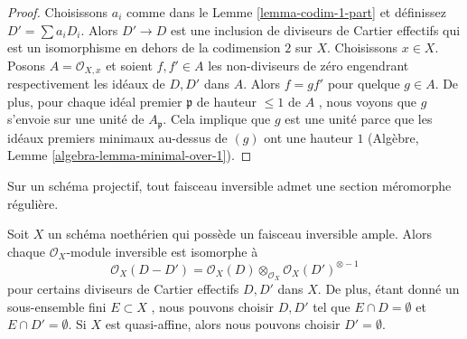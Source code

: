 \begin{proof}
Choisissons  $a_i$  comme dans le Lemme  \ref{lemma-codim-1-part}  et définissez
 $D' = \sum a_i D_i$. Alors  $D' \to D$  est une inclusion de diviseurs de Cartier
effectifs qui est un isomorphisme en dehors de la codimension  $2$  sur
 $X$. Choisissons  $x \in X$. Posons  $A = \mathcal{O}_{X, x}$  et soient
 $f, f' \in A$  les non-diviseurs de zéro engendrant respectivement les idéaux de  $D, D'$  dans
 $A$. Alors  $f = gf'$  pour quelque  $g \in A$. De plus, pour chaque
idéal premier  $\mathfrak p$  de hauteur  $\leq 1$  de  $A$ , nous voyons
que  $g$  s'envoie sur une unité de  $A_\mathfrak p$. Cela implique que
 $g$  est une unité parce que les idéaux premiers minimaux au-dessus de
 $(g)$  ont une hauteur  $1$  (Algèbre, Lemme  \ref{algebra-lemma-minimal-over-1}).
\end{proof}

\begin{lemma}
\label{lemma-quasi-projective-Noetherian-pic-effective-Cartier}
\begin{slogan}
Sur un schéma projectif, tout faisceau inversible admet une section méromorphe
régulière.
\end{slogan}
Soit  $X$  un schéma noethérien qui possède un faisceau inversible ample.
Alors chaque  $\mathcal{O}_X$-module inversible est isomorphe à
$$
\mathcal{O}_X(D - D') =
\mathcal{O}_X(D) \otimes_{\mathcal{O}_X} \mathcal{O}_X(D')^{\otimes -1}
$$
pour certains diviseurs de Cartier effectifs  $D, D'$  dans  $X$. De
plus, étant donné un sous-ensemble fini  $E \subset X$ , nous pouvons choisir
 $D, D'$  tel que  $E \cap D = \emptyset$  et  $E \cap D' = \emptyset$. Si  $X$  est
quasi-affine, alors nous pouvons choisir  $D' = \emptyset$.
\end{lemma}


